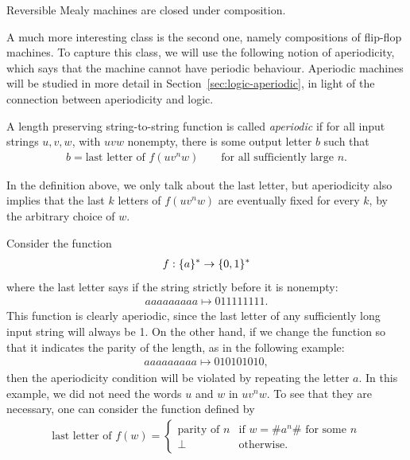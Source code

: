 \begin{lemma}\label{lem:reversible-composition}
    Reversible Mealy machines are closed under composition.
\end{lemma}

A much more interesting class is the second one, namely compositions of flip-flop machines. To capture this class, we will use the following notion of aperiodicity, which says that the machine cannot have periodic behaviour. Aperiodic machines will be studied in more detail in Section~\ref{sec:logic-aperiodic}, in light of the connection between aperiodicity and logic.

\begin{definition}[Aperiodic]\label{def:aperiodic-mealy}
    A length preserving string-to-string function is called \emph{aperiodic} if for all input strings $u,v,w$, with $uvw$ nonempty, there is some output letter $b$ such that \begin{align*}
    b = \text{last letter of $f(uv^nw)$}  \qquad \text{for all sufficiently large $n$}.
    \end{align*}
\end{definition}

In the definition above, we only talk about the last letter, but aperiodicity also implies that the last $k$ letters of $f(uv^nw)$ are eventually fixed for every $k$, by the arbitrary choice of $w$.


\begin{myexample}
    \label{ex:size-threshold-3}
Consider the function 
\begin{align*}
f : \{a\}^* \to \{0,1\}^*
\end{align*}
where the last letter says if the string strictly before it is nonempty:
\begin{align*}
    aaaaaaaaa \mapsto 011111111.
\end{align*}
This function is clearly aperiodic, since the last letter of any sufficiently long input string will always be 1. On the other hand, if we change the function so that it indicates the parity of the length, as in the following example: 
\begin{align*}
    aaaaaaaaa \mapsto 010101010, 
\end{align*}
then the  aperiodicity condition will be  violated by repeating the letter $a$. In this example, we did not need the words $u$ and $w$ in $uv^nw$. To see that they are necessary, one can consider the function defined by 
\begin{align*}
\text{last letter of }f(w) = 
\begin{cases}
     \text{parity of $n$} & \text{if $w = \#a^n\#$ for some $n$}\\
     \bot & \text{otherwise.}
\end{cases}
\end{align*}
\end{myexample}


